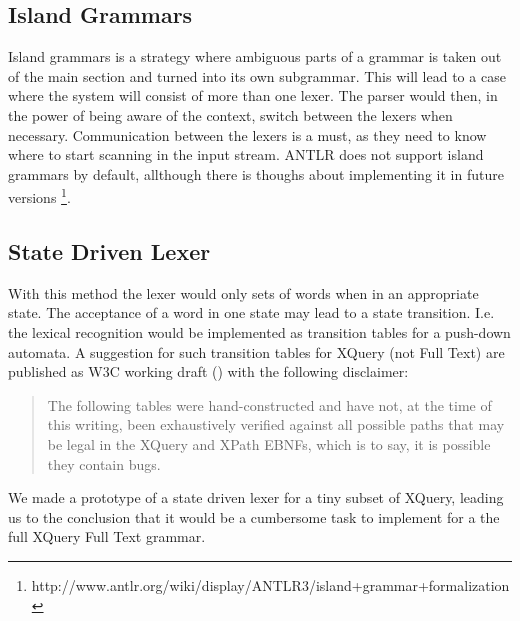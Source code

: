 \subsection{Island Grammars}
Island grammars is a strategy where ambiguous parts of a grammar is taken out of the main section and turned into its own subgrammar. This will lead to a case where the system will consist of more than one lexer. The parser would then, in the power of being aware of the context, switch between the lexers when necessary. Communication between the lexers is a must, as they need to know where to start scanning in the input stream. ANTLR does not support island grammars by default, allthough there is thoughs about implementing it in future versions \footnote{http://www.antlr.org/wiki/display/ANTLR3/island+grammar+formalization}.

\subsection{State Driven Lexer}
With this method the lexer would only sets of words when in an appropriate state. The acceptance of a word in one state may lead to a state transition. I.e. the lexical recognition would be implemented as transition tables for a push-down automata. A suggestion for such transition tables for XQuery (not Full Text) are published as W3C working draft (\cite{createTokenizer}) with the following disclaimer:
\begin{quote}
The following tables were hand-constructed and have not, at the time of this writing, been exhaustively verified against all possible paths that may be legal in the XQuery and XPath EBNFs, which is to say, it is possible they contain bugs.
\end{quote}
We made a prototype of a state driven lexer for a tiny subset of XQuery, leading us to the conclusion that it would be a cumbersome task to implement for a the full XQuery Full Text grammar.